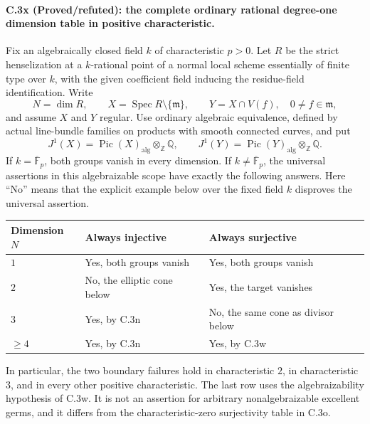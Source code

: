 \paragraph{C.3x (Proved/refuted): the complete ordinary rational degree-one dimension table in positive characteristic.}
Fix an algebraically closed field $k$ of characteristic $p>0$.
Let $R$ be the strict henselization at a $k$-rational point of a
normal local scheme essentially of finite type over $k$, with the
given coefficient field inducing the residue-field identification.
Write
\[
 N=\dim R,\qquad
 X=\operatorname{Spec}R\setminus\{\mathfrak m\},\qquad
 Y=X\cap V(f),\quad 0\ne f\in\mathfrak m,
\]
and assume $X$ and $Y$ regular. Use ordinary algebraic equivalence,
defined by actual line-bundle families on products with smooth
connected curves, and put
\[
 J^1(X)=\operatorname{Pic}(X)_{\mathrm{alg}}\otimes_{\mathbb Z}\mathbb Q,
 \qquad
 J^1(Y)=\operatorname{Pic}(Y)_{\mathrm{alg}}\otimes_{\mathbb Z}\mathbb Q.
\]
If $k=\overline{\mathbb F}_p$, both groups vanish in every dimension.
If $k\ne\overline{\mathbb F}_p$, the universal assertions in this
algebraizable scope have exactly the following answers.
Here ``No'' means that the explicit example below over the fixed
field $k$ disproves the universal assertion.

\begin{center}
\begin{tabular}{lll}
\toprule
Dimension $N$ & Always injective & Always surjective \\
\midrule
$1$ & Yes, both groups vanish & Yes, both groups vanish \\
$2$ & No, the elliptic cone below & Yes, the target vanishes \\
$3$ & Yes, by C.3n & No, the same cone as divisor below \\
$\ge4$ & Yes, by C.3n & Yes, by C.3w \\
\bottomrule
\end{tabular}
\end{center}

In particular, the two boundary failures hold in characteristic
$2$, in characteristic $3$, and in every other positive
characteristic. The last row uses the algebraizability hypothesis
of C.3w. It is not an assertion for arbitrary nonalgebraizable
excellent germs, and it differs from the characteristic-zero
surjectivity table in C.3o.

